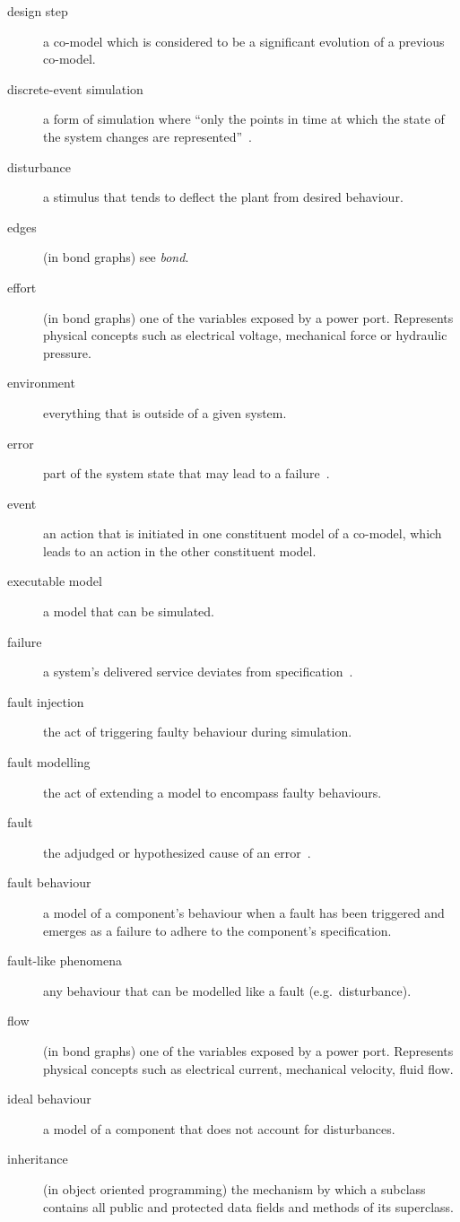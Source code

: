 \documentclass{crescendorepchap}
\begin{document}
\begin{description}
\item[design step] a co-model which is considered to be a significant evolution of a previous co-model.
\item[discrete-event simulation] a form of simulation where ``only the points in time at which the state of the system changes are represented''~\cite[p.~15]{Robinson04}.
\item[disturbance] a stimulus that tends to deflect the plant from desired behaviour.
\item[edges] (in bond graphs) see \textit{bond}.
\item[effort] (in bond graphs) one of the variables exposed by a power port.  Represents physical concepts such as electrical voltage, mechanical force or hydraulic pressure.
\item[environment] everything that is outside of a given system.
\item[error] part of the system state that may lead to a failure~\cite{Avizienis&04}.
\item[event] an action that is initiated in one constituent model of a co-model, which leads to an action in the other constituent model.
\item[executable model] a model that can be simulated.
\item[failure] a system's delivered service deviates from specification~\cite{Avizienis&04}.
\item[fault injection] the act of triggering faulty behaviour during simulation.
\item[fault modelling] the act of extending a model to encompass faulty behaviours.
\item[fault] the adjudged or hypothesized cause of an error~\cite{Avizienis&04}.
\item[fault behaviour] a model of a component's behaviour when a fault has been triggered and emerges as a failure to adhere to the component's specification.
\item[fault-like phenomena] any behaviour that can be modelled like a fault (e.g.\ disturbance).
\item[flow] (in bond graphs) one of the variables exposed by a power port.  Represents physical concepts such as electrical current, mechanical velocity, fluid flow.
\item[ideal behaviour] a model of a component that does not account for disturbances.
\item[inheritance] (in object oriented programming) the mechanism by which a subclass contains all public and protected data fields and methods of its superclass.

\end{description}
\end{document}
